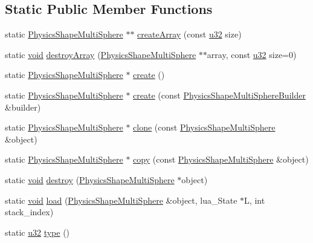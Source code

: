 \subsection*{Static Public Member Functions}
\begin{DoxyCompactItemize}
\item 
static \mbox{\hyperlink{classnjli_1_1_physics_shape_multi_sphere}{Physics\+Shape\+Multi\+Sphere}} $\ast$$\ast$ \mbox{\hyperlink{classnjli_1_1_physics_shape_multi_sphere_a27f19ac79c5e8b7034fcfb4fc05b2388}{create\+Array}} (const \mbox{\hyperlink{_util_8h_a10e94b422ef0c20dcdec20d31a1f5049}{u32}} size)
\item 
static \mbox{\hyperlink{_thread_8h_af1e856da2e658414cb2456cb6f7ebc66}{void}} \mbox{\hyperlink{classnjli_1_1_physics_shape_multi_sphere_a67cf27c9dcf4d1dd68ea1c603eb054dd}{destroy\+Array}} (\mbox{\hyperlink{classnjli_1_1_physics_shape_multi_sphere}{Physics\+Shape\+Multi\+Sphere}} $\ast$$\ast$array, const \mbox{\hyperlink{_util_8h_a10e94b422ef0c20dcdec20d31a1f5049}{u32}} size=0)
\item 
static \mbox{\hyperlink{classnjli_1_1_physics_shape_multi_sphere}{Physics\+Shape\+Multi\+Sphere}} $\ast$ \mbox{\hyperlink{classnjli_1_1_physics_shape_multi_sphere_a5a3b9657b148c2e4e4ea26c89097c679}{create}} ()
\item 
static \mbox{\hyperlink{classnjli_1_1_physics_shape_multi_sphere}{Physics\+Shape\+Multi\+Sphere}} $\ast$ \mbox{\hyperlink{classnjli_1_1_physics_shape_multi_sphere_af29257cf63678fe9718a821300d5575b}{create}} (const \mbox{\hyperlink{classnjli_1_1_physics_shape_multi_sphere_builder}{Physics\+Shape\+Multi\+Sphere\+Builder}} \&builder)
\item 
static \mbox{\hyperlink{classnjli_1_1_physics_shape_multi_sphere}{Physics\+Shape\+Multi\+Sphere}} $\ast$ \mbox{\hyperlink{classnjli_1_1_physics_shape_multi_sphere_a465246d891108d982e8c18bdf2c49917}{clone}} (const \mbox{\hyperlink{classnjli_1_1_physics_shape_multi_sphere}{Physics\+Shape\+Multi\+Sphere}} \&object)
\item 
static \mbox{\hyperlink{classnjli_1_1_physics_shape_multi_sphere}{Physics\+Shape\+Multi\+Sphere}} $\ast$ \mbox{\hyperlink{classnjli_1_1_physics_shape_multi_sphere_a64000bc87d83940963e1b323328377c2}{copy}} (const \mbox{\hyperlink{classnjli_1_1_physics_shape_multi_sphere}{Physics\+Shape\+Multi\+Sphere}} \&object)
\item 
static \mbox{\hyperlink{_thread_8h_af1e856da2e658414cb2456cb6f7ebc66}{void}} \mbox{\hyperlink{classnjli_1_1_physics_shape_multi_sphere_ab662607b3880e2239637469d75955ec3}{destroy}} (\mbox{\hyperlink{classnjli_1_1_physics_shape_multi_sphere}{Physics\+Shape\+Multi\+Sphere}} $\ast$object)
\item 
static \mbox{\hyperlink{_thread_8h_af1e856da2e658414cb2456cb6f7ebc66}{void}} \mbox{\hyperlink{classnjli_1_1_physics_shape_multi_sphere_acc4f13c0be21f65b1eaa63c357981a0c}{load}} (\mbox{\hyperlink{classnjli_1_1_physics_shape_multi_sphere}{Physics\+Shape\+Multi\+Sphere}} \&object, lua\+\_\+\+State $\ast$L, int stack\+\_\+index)
\item 
static \mbox{\hyperlink{_util_8h_a10e94b422ef0c20dcdec20d31a1f5049}{u32}} \mbox{\hyperlink{classnjli_1_1_physics_shape_multi_sphere_ab3bdb3d0b0d07962fc85babae7026614}{type}} ()
\end{DoxyCompactItemize}
